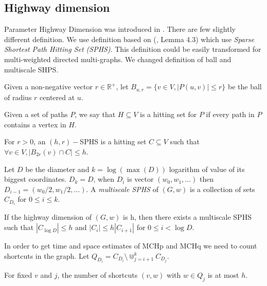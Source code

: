 \subsection{Highway dimension}


Parameter Highway Dimension was introduced in \cite{abraham2010highway}.
There are few slightly different definition. 
We use definition based on (\cite{abraham2016highway}, Lemma 4.3)
which  use \emph{ Sparse Shortest Path Hitting Set (SPHS)}.
This definition could be easily transformed for multi-weighted directed
multi-graphs. We changed definition of ball and multiscale SHPS.


\begin{definition}
Given a non-negative vector $r \in \mathbb{R}^+$, let 
$B_{u,r} = \{v \in V, |P(u, v)| \le r \}$ 
be the ball of radius $r$ centered at $u$.
\end{definition}

\begin{definition}
Given a set of paths $P$, we say that $H \subseteq V$ is a hitting set for $P$ if every
path in $P$ contains a vertex in $H$. 
\end{definition}

\begin{definition}
For $r > 0$, an $(h, r)-$SPHS is a hitting set $C \subseteq V$ such that
$\forall v \in V, |B_{2r} (v) \cap C| \le h$.
\end{definition}

\begin{definition}
Let $D$ be the diameter and $k = \log(\max(D))$ logarithm of value of its biggest coordinates. 
$D_k = D$, when $D_i$ is vector $(w_0,w_1,\dots)$ then $D_{i-1} = (w_0/2,w_1/2,\dots)$. 
A \emph{multiscale SPHS} of $(G,w)$ is a collection of sets $C_{D_i}$ for $0 \le i \le k$.
\end{definition}

\begin{definition}
If the highway dimension of $(G,w)$ is h, then there exists a multiscale
SPHS such that $|C_{\log D}| \le h$ and $|C_i| \le h|C_{i+1}|$ for $0 \le i < \log D$.
\end{definition}

In order to get time and space estimates of MCHp and MCHq we need to count shortcuts in
the graph. Let $Q_{D_i} = C_{D_i} \setminus \Cup^{k}_{j=i+1}C_{D_j}$.

\begin{lemma}
For fixed $v$ and $j$, the number of shortcuts $(v,w)$ with $w\in Q_j$ is at most $h$.
\end{lemma}


